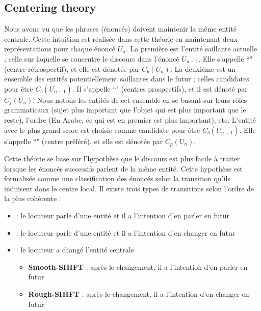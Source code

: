 \documentclass{KodeBook}
\begin{document}
\subsection{Centering theory}

Nous avons vu que les phrases (énoncés) doivent maintenir la même entité centrale. 
Cette intuition est réalisée dans cette théorie en maintenant deux représentations pour chaque énoncé $U_n$.
La première est l'entité saillante actuelle ; celle sur laquelle se concentre le discours dans l'énoncé $ U_{n-1} $.
Elle s'appelle ``" (centre rétrospectif), et elle est dénotée par $C_b(U_n)$. 
La deuxième est un ensemble des entités potentiellement saillantes dans le futur ; celles candidates pour être $C_b(U_{n+1})$.
Il s'appelle ``" (centres prospectifs), et il est dénoté par $C_f(U_n)$. 
Nous notons les entités de cet ensemble en se basant sur leurs rôles grammaticaux (sujet plus important que l'objet qui est plus important que le reste), l'ordre (En Arabe, ce qui est en premier est plus important), etc.
L'entité avec le plus grand score est choisie comme candidate pour être $C_b(U_{n+1})$.
Elle s'appelle ``" (centre préféré), et elle est dénotée par $C_p(U_n)$. 

Cette théorie se base sur l'hypothèse que le discours est plus facile à traiter lorsque les énoncés successifs parlent de la même entité. 
Cette hypothèse est formalisée comme une classification des énoncés selon la transition qu'ils induisent dans le centre local.
Il existe trois types de transitions \cite{2004-poesio-al} selon l'ordre de la plus cohérente : 
\begin{itemize}
	\item {} : le locuteur parle d'une entité et il a l'intention d'en parler en futur
	\item {} : le locuteur parle d'une entité et il a l'intention d'en changer en futur
	\item {} : le locuteur a changé l'entité centrale
	\begin{itemize}
		\item \textbf{Smooth-SHIFT} : après le changement, il a l'intention d'en parler en futur
		\item \textbf{Rough-SHIFT} : après le changement, il a l'intention d'en changer en futur
	\end{itemize}
\end{itemize}
\end{document}
